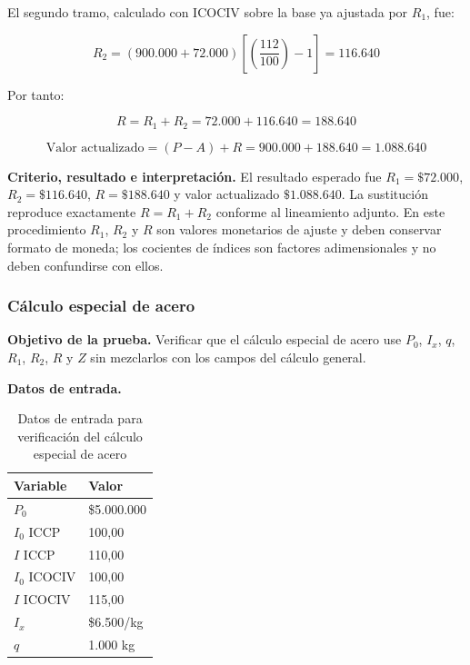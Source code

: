 \documentclass[12pt,letterpaper]{article}
\newcommand{\ICOCIV}{ICOCIV}
\newcommand{\ICCP}{ICCP}
\begin{document}
El segundo tramo, calculado con \ICOCIV{} sobre la base ya ajustada por \(R_1\), fue:

\begin{equation}
R_2=(900.000+72.000)\left[\left(\frac{112}{100}\right)-1\right]=116.640
\end{equation}

Por tanto:

\begin{equation}
R=R_1+R_2=72.000+116.640=188.640
\end{equation}

\begin{equation}
\text{Valor actualizado}=(P-A)+R=900.000+188.640=1.088.640
\end{equation}

\textbf{Criterio, resultado e interpretación.} El resultado esperado fue \(R_1=\$72.000\), \(R_2=\$116.640\), \(R=\$188.640\) y valor actualizado \(\$1.088.640\). La sustitución reproduce exactamente \(R=R_1+R_2\) conforme al lineamiento adjunto. En este procedimiento \(R_1\), \(R_2\) y \(R\) son valores monetarios de ajuste y deben conservar formato de moneda; los cocientes de índices son factores adimensionales y no deben confundirse con ellos.

\subsubsection{Cálculo especial de acero}

\textbf{Objetivo de la prueba.} Verificar que el cálculo especial de acero use \(P_0\), \(I_x\), \(q\), \(R_1\), \(R_2\), \(R\) y \(Z\) sin mezclarlos con los campos del cálculo general.

\textbf{Datos de entrada.}

\begin{table}[H]
\centering
\caption{Datos de entrada para verificación del cálculo especial de acero}
\label{tab:prueba_acero_datos}
\vspace{\baselineskip}
\scriptsize
\begin{tabular}{ll}
\toprule
\textbf{Variable} & \textbf{Valor} \\
\midrule
\(P_0\) & \$5.000.000 \\
\(I_0\) \ICCP{} & 100,00 \\
\(I\) \ICCP{} & 110,00 \\
\(I_0\) \ICOCIV{} & 100,00 \\
\(I\) \ICOCIV{} & 115,00 \\
\(I_x\) & \$6.500/kg \\
\(q\) & 1.000 kg \\
\bottomrule
\end{tabular}
\end{table}
\end{document}
